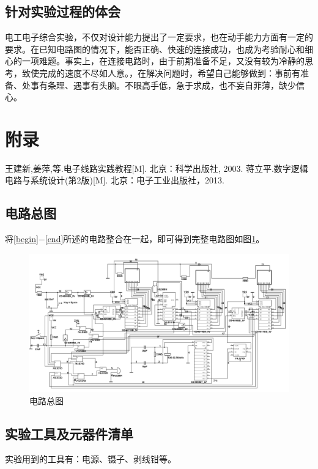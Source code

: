 \documentclass[12pt]{article}
\begin{document}
\subsection{针对实验过程的体会}
电工电子综合实验，不仅对设计能力提出了一定要求，也在动手能力方面有一定的要求。在已知电路图的情况下，能否正确、快速的连接成功，也成为考验耐心和细心的一项难题。事实上，在连接电路时，由于前期准备不足，又没有较为冷静的思考，致使完成的速度不尽如人意。，在解决问题时，希望自己能够做到：事前有准备、处事有条理、遇事有头脑。不眼高手低，急于求成，也不妄自菲薄，缺少信心。


\appendix
\section{附录}
\begin{thebibliography}{15}
\bibitem{}王建新,姜萍,等.电子线路实践教程[M]. 北京：科学出版社, 2003.
蒋立平.数字逻辑电路与系统设计(第2版)[M]. 北京：电子工业出版社，2013.
\end{thebibliography}
\subsection{电路总图}
将\ref{begin}$-$\ref{end}所述的电路整合在一起，即可得到完整电路图如图\ref{fig:zong}。
\begin{figure}[h]
\centering
\includegraphics[width=\textwidth]{zong.png}
\caption{电路总图}
  \label{fig:zong}
\end{figure}
\subsection{实验工具及元器件清单}
实验用到的工具有：电源、镊子、剥线钳等。
\end{document}

